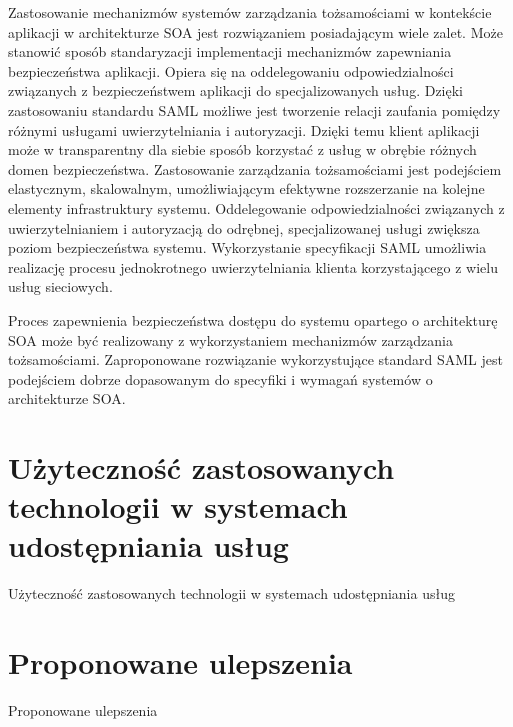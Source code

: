	Zastosowanie mechanizmów systemów zarządzania tożsamościami w kontekście aplikacji w architekturze SOA jest rozwiązaniem posiadającym wiele zalet. Może stanowić sposób standaryzacji implementacji mechanizmów zapewniania bezpieczeństwa aplikacji. Opiera się na oddelegowaniu odpowiedzialności związanych z bezpieczeństwem aplikacji do specjalizowanych usług. Dzięki zastosowaniu standardu SAML możliwe jest tworzenie relacji zaufania pomiędzy różnymi usługami uwierzytelniania i autoryzacji. Dzięki temu klient aplikacji może w transparentny dla siebie sposób korzystać z usług w obrębie różnych domen bezpieczeństwa. Zastosowanie zarządzania tożsamościami jest podejściem elastycznym, skalowalnym, umożliwiającym efektywne rozszerzanie na kolejne elementy infrastruktury systemu. Oddelegowanie odpowiedzialności związanych z uwierzytelnianiem i autoryzacją do odrębnej, specjalizowanej usługi zwiększa poziom bezpieczeństwa systemu. Wykorzystanie specyfikacji SAML umożliwia realizację procesu jednokrotnego uwierzytelniania klienta korzystającego z wielu usług sieciowych.

	Proces zapewnienia bezpieczeństwa dostępu do systemu opartego o architekturę SOA może być realizowany z wykorzystaniem mechanizmów zarządzania tożsamościami. Zaproponowane rozwiązanie wykorzystujące standard SAML jest podejściem dobrze dopasowanym do specyfiki i wymagań systemów o architekturze SOA.


\section{Użyteczność zastosowanych technologii w systemach udostępniania usług}
\label{sec:uzytecznosc}

Użyteczność zastosowanych technologii w systemach udostępniania usług


\section{Proponowane ulepszenia}
\label{sec:ulepszenia}

Proponowane ulepszenia

